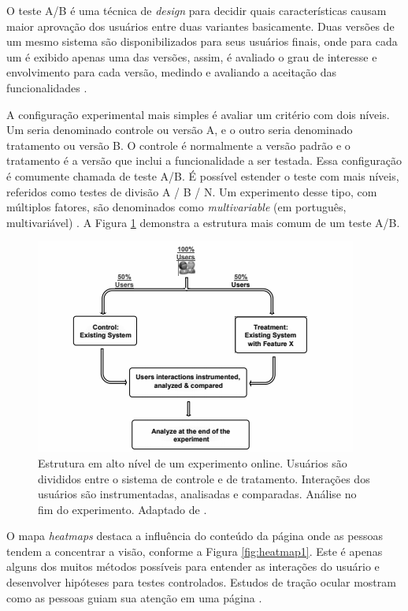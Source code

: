 \documentclass[12pt]{article}
\begin{document}
O teste A/B é uma técnica de \textit{design} para decidir quais características causam maior aprovação dos usuários entre duas variantes basicamente. Duas versões de um mesmo sistema são disponibilizados para seus usuários finais, onde para cada um é exibido apenas uma das versões, assim, é avaliado o grau de interesse e envolvimento para cada versão, medindo e avaliando a aceitação das funcionalidades \cite{goward:13}.

A configuração experimental mais simples é avaliar um critério com dois níveis. Um seria denominado controle ou versão A, e o outro seria denominado tratamento ou versão B.
O controle é normalmente a versão padrão e o tratamento é a versão que inclui a funcionalidade a ser testada. Essa configuração é comumente chamada de teste A/B.
É possível estender o teste com mais níveis, referidos como testes de divisão A / B / N. Um experimento desse tipo, com múltiplos fatores, são denominados como \textit{multivariable} (em português, multivariável) \cite{kohavi2010online}. A Figura \ref{fig:onlineExp1} demonstra a estrutura mais comum de um teste A/B.

\begin{figure}[ht]
\centering
\includegraphics[width=.8\textwidth]{fig2.png}
\caption{Estrutura em alto nível de um experimento online. Usuários são divididos entre o sistema de controle e de tratamento. Interações dos usuários são instrumentadas, analisadas e comparadas. Análise no fim do experimento. Adaptado de \cite{kohavi2010online}.}
\label{fig:onlineExp1}
\end{figure}

O mapa \textit{heatmaps} destaca a influência do conteúdo da página onde as pessoas tendem a concentrar a visão, conforme a Figura \ref{fig:heatmap1}. Este é apenas alguns dos muitos métodos possíveis para entender as interações do usuário e desenvolver hipóteses para testes controlados. Estudos de tração ocular mostram como as pessoas guiam sua atenção em uma página \cite{goward:13}.
\end{document}
